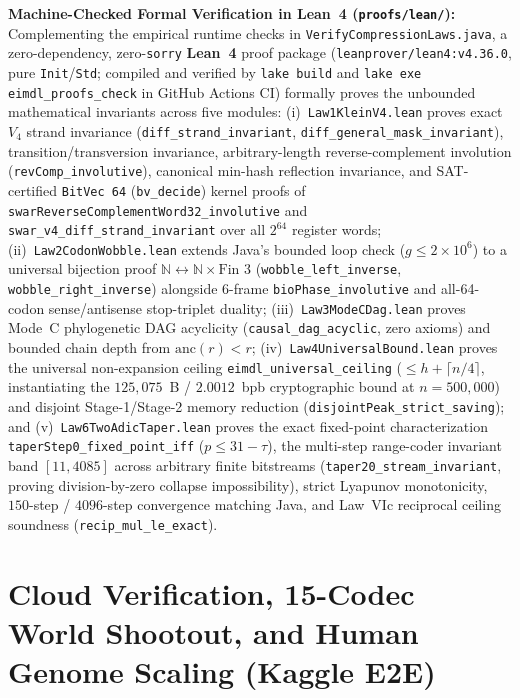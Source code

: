 \documentclass[10pt]{article}
\theoremstyle{definition}
\begin{document}
\medskip
\noindent
\textbf{Machine-Checked Formal Verification in Lean~4 (\texttt{proofs/lean/}):}
Complementing the empirical runtime checks in \texttt{VerifyCompressionLaws.java}, a zero-dependency, zero-\texttt{sorry} \textbf{Lean~4} proof package (\texttt{leanprover/lean4:v4.36.0}, pure \texttt{Init}/\texttt{Std}; compiled and verified by \texttt{lake build} and \texttt{lake exe eimdl\_proofs\_check} in GitHub Actions CI) formally proves the unbounded mathematical invariants across five modules:
(i)~\texttt{Law1KleinV4.lean} proves exact $V_4$ strand invariance (\texttt{diff\_strand\_invariant}, \texttt{diff\_general\_mask\_invariant}), transition/transversion invariance, arbitrary-length reverse-complement involution (\texttt{revComp\_involutive}), canonical min-hash reflection invariance, and SAT-certified \texttt{BitVec 64} (\texttt{bv\_decide}) kernel proofs of \texttt{swarReverseComplementWord32\_involutive} and \texttt{swar\_v4\_diff\_strand\_invariant} over all $2^{64}$ register words;
(ii)~\texttt{Law2CodonWobble.lean} extends Java's bounded loop check ($g \le 2\times 10^6$) to a universal bijection proof $\mathbb{N} \leftrightarrow \mathbb{N}\times\text{Fin }3$ (\texttt{wobble\_left\_inverse}, \texttt{wobble\_right\_inverse}) alongside 6-frame \texttt{bioPhase\_involutive} and all-64-codon sense/antisense stop-triplet duality;
(iii)~\texttt{Law3ModeCDag.lean} proves Mode~C phylogenetic DAG acyclicity (\texttt{causal\_dag\_acyclic}, zero axioms) and bounded chain depth from $\text{anc}(r) < r$;
(iv)~\texttt{Law4UniversalBound.lean} proves the universal non-expansion ceiling \texttt{eimdl\_universal\_ceiling} ($\le h + \lceil n/4 \rceil$, instantiating the $125,075$~B / $2.0012$~bpb cryptographic bound at $n=500,000$) and disjoint Stage-1/Stage-2 memory reduction (\texttt{disjointPeak\_strict\_saving}); and
(v)~\texttt{Law6TwoAdicTaper.lean} proves the exact fixed-point characterization \texttt{taperStep0\_fixed\_point\_iff} ($p \le 31-\tau$), the multi-step range-coder invariant band $[11, 4085]$ across arbitrary finite bitstreams (\texttt{taper20\_stream\_invariant}, proving division-by-zero collapse impossibility), strict Lyapunov monotonicity, $150$-step / $4096$-step convergence matching Java, and Law~VIc reciprocal ceiling soundness (\texttt{recip\_mul\_le\_exact}).

\section{Cloud Verification, 15-Codec World Shootout, and Human Genome Scaling (Kaggle E2E)}
\end{document}

